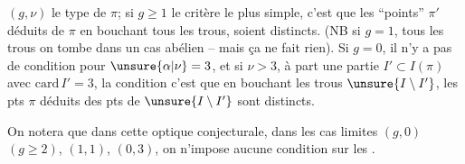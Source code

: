  $(g,\nu)$ le type de $\pi$;  si $g\geq1$ le critère le plus simple, c'est que les ``\inserted{$\Gamma^{\natural}$-}points''  $\pi'$ déduits de $\pi$ en bouchant tous les trous, soient distincts.  (NB si $g=1$,    tous les trous on tombe dans un cas abélien -- mais ça ne fait rien). Si $g=0$,  il n'y a pas de condition pour $\unsure{\alpha|\nu}=3$, et si $\nu>3$,  à part une  partie $I'\subset I(\pi)$ avec $\mathrm{card}\,I'=3$, la condition c'est que en bouchant les trous  $\unsure{I\setminus I'}$, les \inserted{$\Gamma^{\natural}$-}pts  $\pi$ déduits des pts de $\unsure{I\setminus I'}$ sont distincts.

On notera que dans cette optique conjecturale, dans les cas limites $(g,0)$ $(g\geq2)$, $(1,1)$, $(0,3)$, on n'impose aucune condition  sur les .

